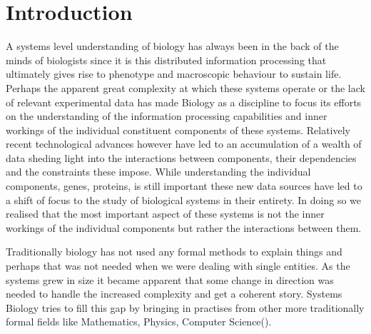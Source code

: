 
\chapter{Introduction}  %

\ifpdf
    \graphicspath{{Chapter1/Figs/Raster/}{Chapter1/Figs/PDF/}{Chapter1/Figs/}}
\else
    \graphicspath{{Chapter1/Figs/Vector/}{Chapter1/Figs/}}
\fi


A systems level understanding of biology has always been in the back
of the minds of biologists since it is this distributed information
processing that ultimately gives rise to phenotype and macroscopic
behaviour to sustain life. Perhaps the apparent great complexity at
which these systems operate or the lack of relevant experimental data
has made Biology as a discipline to focus its efforts on the
understanding of the information processing capabilities and inner
workings of the individual constituent components of these
systems. Relatively recent technological advances however have led to
an accumulation of a wealth of data sheding light into the interactions
between components, their dependencies and the constraints these
impose. While understanding the individual components, genes,
proteins, is still important these new data sources have led to a shift
of focus to the study of biological systems in their entirety. In
doing so we realised that the most important aspect of these systems
is not the inner workings of the individual components but rather the
interactions between them.

Traditionally biology has not used any formal methods to explain
things and perhaps that was not needed when we were dealing with
single entities. As the systems grew in size it became apparent that
some change in direction was needed to handle the increased complexity
and get a coherent story. Systems Biology tries to fill this gap by
bringing in practises from other more traditionally formal fields like
Mathematics, Physics, Computer Science(\citet{kitano2002systems, ideker2001new}).

